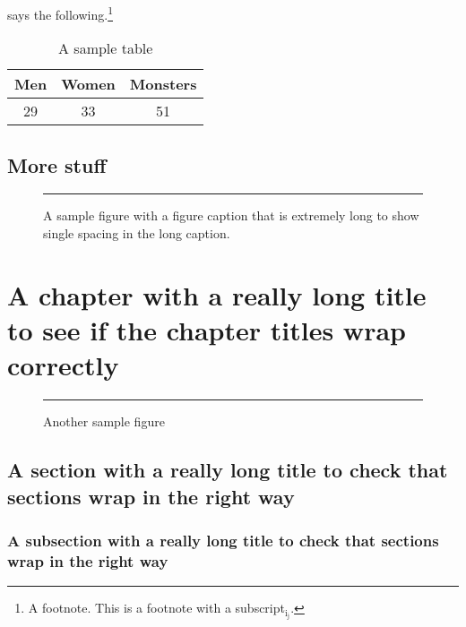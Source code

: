 \documentclass[lscape]{msu-thesis}
\begin{document}
\lipsum[1]
\lipsum[2]\cite{Munn1999} says the following.\footnote{A footnote. This is a footnote with a subscript$_{\text{i}_{\text{j}}}$.  \lipsum[9]} \lipsum[2]
\begin{table}
\centering
\begin{tabular}{ccc}
\toprule
Men & Women & Monsters\\
\midrule
29 & 33 & 51\\
\bottomrule
\end{tabular}
\caption{A sample table}
\end{table}

\lipsum[3]
\section{More stuff}
\lipsum[4]\cite{Munn2005}
\begin{figure}
\centering
{\color{gray!40}\rule{2in}{3in}}
\caption[A sample figure]{A sample figure with a figure caption that is extremely long to show single spacing in the long caption.}
\end{figure}
\lipsum[5]
\lipsum[10]
\chapter{A chapter with a really long title to see if the chapter titles wrap correctly}
\lipsum
\begin{figure}
\centering
{\color{gray!40}\rule{4in}{2in}}
\caption{Another sample figure}
\end{figure}
\lipsum[6]
\section{A section with a really long title to check that sections wrap in the right way}
\subsection{A subsection with a really long title to check that sections wrap in the right way}
\end{document}
